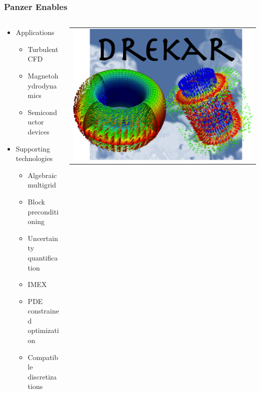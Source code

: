 \documentclass{beamer}
\begin{document}
  \begin{frame}
    \frametitle{Panzer Enables}
    \begin{columns}
      \begin{column}{0.6\textwidth}
        \begin{itemize}
          \item Applications
          \begin{itemize}
            \item Turbulent CFD
            \item Magnetohydrodynamics
            \item Semiconductor devices
          \end{itemize}
          \item Supporting technologies
          \begin{itemize}
            \item Algebraic multigrid
            \item Block preconditioning
            \item Uncertainty quantification
            \item IMEX
            \item PDE constrained optimization
            \item Compatible discretizations
          \end{itemize}
        \end{itemize}
      \end{column}
      \begin{column}{0.4\textwidth}
        \begin{tabular}{c}
          \includegraphics[width=.9\textwidth]{drekarLogo}\\

\end{tabular}
\end{column}
\end{columns}
\end{frame}
\end{document}
